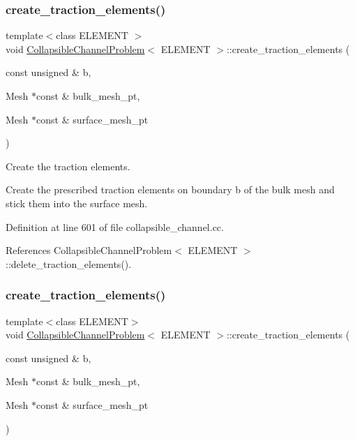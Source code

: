 \subsubsection{\texorpdfstring{create\+\_\+traction\+\_\+elements()}{create\_traction\_elements()}\hspace{0.1cm}{\footnotesize\ttfamily [1/2]}}
{\footnotesize\ttfamily template$<$class E\+L\+E\+M\+E\+NT $>$ \\
void \hyperlink{classCollapsibleChannelProblem}{Collapsible\+Channel\+Problem}$<$ E\+L\+E\+M\+E\+NT $>$\+::create\+\_\+traction\+\_\+elements (\begin{DoxyParamCaption}\item[{const unsigned \&}]{b,  }\item[{Mesh $\ast$const \&}]{bulk\+\_\+mesh\+\_\+pt,  }\item[{Mesh $\ast$const \&}]{surface\+\_\+mesh\+\_\+pt }\end{DoxyParamCaption})\hspace{0.3cm}{\ttfamily [private]}}



Create the traction elements. 

Create the prescribed traction elements on boundary b of the bulk mesh and stick them into the surface mesh. 

Definition at line 601 of file collapsible\+\_\+channel.\+cc.



References Collapsible\+Channel\+Problem$<$ E\+L\+E\+M\+E\+N\+T $>$\+::delete\+\_\+traction\+\_\+elements().

\mbox{\label{classCollapsibleChannelProblem_a70cfe97c12c0cb6a2a81266cdd4d6088}} 
\subsubsection{\texorpdfstring{create\+\_\+traction\+\_\+elements()}{create\_traction\_elements()}\hspace{0.1cm}{\footnotesize\ttfamily [2/2]}}
{\footnotesize\ttfamily template$<$class E\+L\+E\+M\+E\+NT$>$ \\
void \hyperlink{classCollapsibleChannelProblem}{Collapsible\+Channel\+Problem}$<$ E\+L\+E\+M\+E\+NT $>$\+::create\+\_\+traction\+\_\+elements (\begin{DoxyParamCaption}\item[{const unsigned \&}]{b,  }\item[{Mesh $\ast$const \&}]{bulk\+\_\+mesh\+\_\+pt,  }\item[{Mesh $\ast$const \&}]{surface\+\_\+mesh\+\_\+pt }\end{DoxyParamCaption})\hspace{0.3cm}{\ttfamily [private]}}

